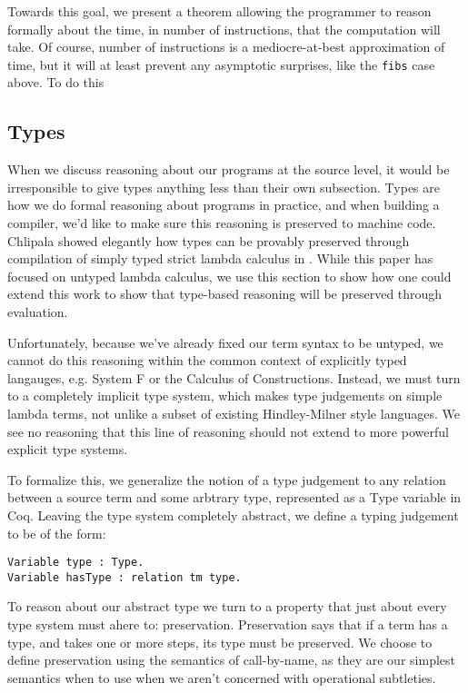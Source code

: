 Towards this goal, we present a theorem allowing the programmer to reason
formally about the time, in number of instructions, that the computation will
take. Of course, number of instructions is a mediocre-at-best approximation of
time, but it will at least prevent any asymptotic surprises, like the
\texttt{fibs} case above. To do this

\subsection{Types}

When we discuss reasoning about our programs at the source level, it would be
irresponsible to give types anything less than their own subsection. Types are
how we do formal reasoning about programs in practice, and when building a
compiler, we'd like to make sure this reasoning is preserved to machine code.
Chlipala showed elegantly how types can be provably preserved through
compilation of simply typed strict lambda calculus in \cite{?}. While this paper
has focused on untyped lambda calculus, we use this section to show how one
could extend this work to show that type-based reasoning will be preserved
through evaluation.  

Unfortunately, because we've already fixed our term syntax to be untyped, we
cannot do this reasoning within the common context of explicitly typed
langauges, e.g. System F or the Calculus of Constructions. Instead, we must turn
to a completely implicit type system, which makes type judgements on simple
lambda terms, not unlike a subset of existing Hindley-Milner style languages. We
see no reasoning that this line of reasoning should not extend to more powerful
explicit type systems. 

To formalize this, we generalize the notion of a type judgement to any relation
between a source term and some arbtrary type, represented as a Type variable in
Coq. Leaving the type system completely abstract, we define a typing judgement
to be of the form:

\begin{lstlisting}
Variable type : Type.
Variable hasType : relation tm type.
\end{lstlisting}

To reason about our abstract type we turn to a property that just about every
type system must ahere to: preservation. Preservation says that if a term has a
type, and takes one or more steps, its type must be preserved. We choose to
define preservation using the semantics of call-by-name, as they are our
simplest semantics when to use when we aren't concerned with operational
subtleties.

